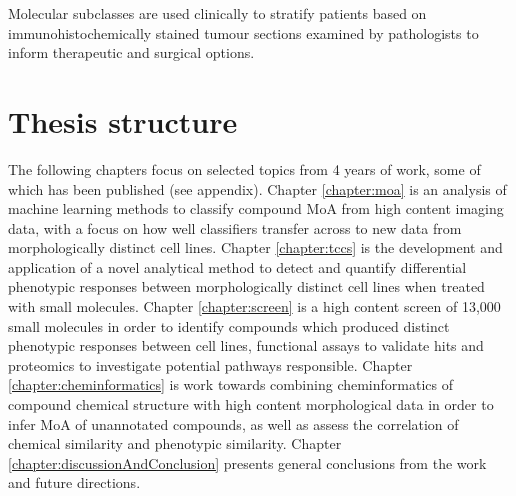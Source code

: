 \documentclass[a4paper,11pt,twoside,openright]{scrbook}
\begin{document}
Molecular subclasses are used clinically to stratify patients based on immunohistochemically stained tumour sections examined by pathologists to inform therapeutic and surgical options.





\section{Thesis structure}
The following chapters focus on selected topics from 4 years of work, some of which has been published (see appendix).
Chapter \ref{chapter:moa} is an analysis of machine learning methods to classify compound MoA from high content imaging data, with a focus on how well classifiers transfer across to new data from morphologically distinct cell lines.
Chapter \ref{chapter:tccs} is the development and application of a novel analytical method to detect and quantify differential phenotypic responses between morphologically distinct cell lines when treated with small molecules.
Chapter \ref{chapter:screen} is a high content screen of 13,000 small molecules in order to identify compounds which produced distinct phenotypic responses between cell lines, functional assays to validate hits and proteomics to investigate potential pathways responsible.
Chapter \ref{chapter:cheminformatics} is work towards combining cheminformatics of compound chemical structure with high content morphological data in order to infer MoA of unannotated compounds, as well as assess the correlation of chemical similarity and phenotypic similarity.
Chapter \ref{chapter:discussionAndConclusion} presents general conclusions from the work and future directions.

\end{document}
